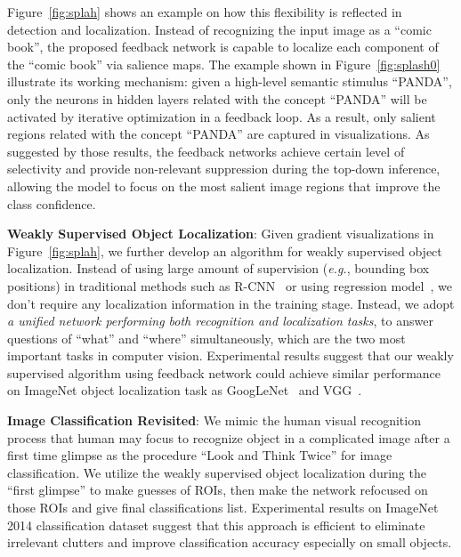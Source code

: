 Figure~\ref{fig:splah} shows an example on how this flexibility is reflected in detection and localization. Instead of recognizing the input image as a ``comic book'', the proposed feedback network is capable to localize each component of the ``comic book'' via salience maps. The example shown in Figure~\ref{fig:splash0} illustrate its working mechanism: given a high-level semantic stimulus ``PANDA'', only the neurons in hidden layers related with the concept ``PANDA'' will be activated by iterative optimization in a feedback loop. As a result, only salient regions related with the concept ``PANDA'' are captured in visualizations.
As suggested by those results, the feedback networks achieve certain level of selectivity and provide non-relevant suppression during the top-down inference, allowing the model to focus on the most salient image regions that improve the class confidence.

\textbf{Weakly Supervised Object Localization}:
Given gradient visualizations in Figure~\ref{fig:splah}, we further develop an algorithm for weakly supervised object localization. Instead of using large amount of supervision (\emph{e.g.}, bounding box positions) in traditional methods such as R-CNN~\cite{girshick2014rich} or using regression model~\cite{erhan2014scalable, Simonyan2014Very}, we don't require any localization information in the training stage. Instead, we adopt \emph{a unified network performing both recognition and localization tasks}, to answer questions of ``what'' and ``where'' simultaneously, which are the two most important tasks in computer vision. Experimental results suggest that our weakly supervised algorithm using feedback network could achieve similar performance on ImageNet object localization task as GoogLeNet~\cite{Szegedy2014Going} and VGG~\cite{Simonyan2014Very}.

\textbf{Image Classification Revisited}:
We mimic the human visual recognition process that human may focus to recognize object in a complicated image after a first time glimpse as the procedure ``Look and Think Twice'' for image classification. We utilize the weakly supervised object localization during the ``first glimpse'' to make guesses of ROIs, then make the network refocused on those ROIs and give final classifications list. Experimental results on ImageNet 2014 classification dataset suggest that this approach is efficient to eliminate irrelevant clutters and improve classification accuracy especially on small objects.


